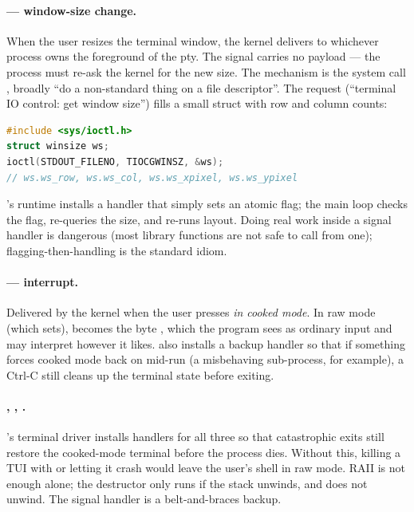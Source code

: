 \paragraph{ --- window-size change.}
When the user resizes the terminal window, the kernel delivers
 to whichever process owns the foreground of the pty.
The signal carries no payload --- the process must re-ask the kernel
for the new size. The mechanism is the system call ,
broadly ``do a non-standard thing on a file descriptor''. The
request  (``terminal IO control: get window size'')
fills a small struct with row and column counts:

\begin{lstlisting}[language=C]
#include <sys/ioctl.h>
struct winsize ws;
ioctl(STDOUT_FILENO, TIOCGWINSZ, &ws);
// ws.ws_row, ws.ws_col, ws.ws_xpixel, ws.ws_ypixel
\end{lstlisting}

\maya{}'s runtime installs a  handler that simply
sets an atomic flag; the main loop checks the flag, re-queries the
size, and re-runs layout. Doing real work inside a signal handler
is dangerous (most library functions are not safe to call from one);
flagging-then-handling is the standard idiom.

\paragraph{ --- interrupt.}
Delivered by the kernel when the user presses  \emph{in
cooked mode}. In raw mode (which \maya{} sets), 
becomes the byte , which the program sees as ordinary
input and may interpret however it likes. \maya{} also installs a
backup  handler so that if something forces cooked
mode back on mid-run (a misbehaving sub-process, for example), a
Ctrl-C still cleans up the terminal state before exiting.

\paragraph{, , .}
\maya{}'s terminal driver installs handlers for all three so that
catastrophic exits still restore the cooked-mode terminal
before the process dies. Without this, killing a TUI with
 or letting it crash would leave the user's shell
in raw mode. RAII is not enough alone; the destructor only runs if
the stack unwinds, and  does not unwind. The signal
handler is a belt-and-braces backup.

